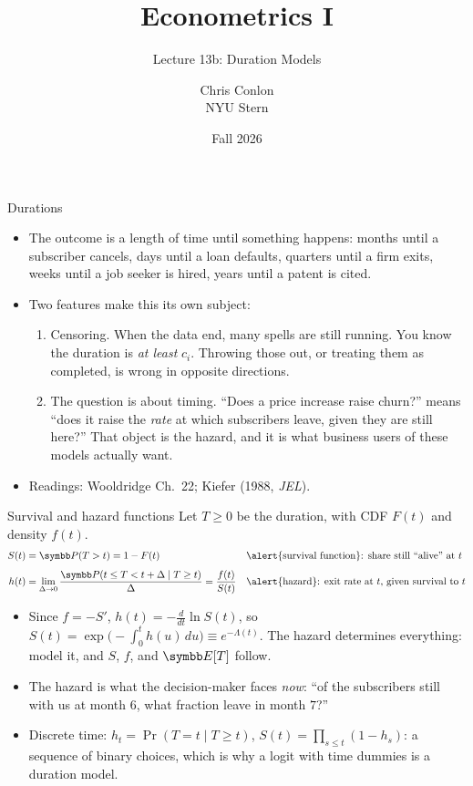 \documentclass[aspectratio=169,11pt]{beamer}
\title[L13b - Duration Models]{ Econometrics I}
\subtitle{Lecture 13b: Duration Models}
\author{Chris Conlon \\NYU Stern}
\date{Fall 2026}
\begin{document}
\maketitle

\begin{frame}{Durations}
\begin{itemize}
	\item The outcome is a \alert{length of time until something happens}: months until a subscriber
	cancels, days until a loan defaults, quarters until a firm exits, weeks until a job seeker is hired,
	years until a patent is cited.
	\medskip
	\item Two features make this its own subject:
	\begin{enumerate}
		\item \alert{Censoring.} When the data end, many spells are still running. You know the
		duration is \emph{at least} $c_i$. Throwing those out, or treating them as completed, is wrong
		in opposite directions.
		\item \alert{The question is about timing.} ``Does a price increase raise churn?'' means
		``does it raise the \emph{rate} at which subscribers leave, given they are still here?'' That
		object is the hazard, and it is what business users of these models actually want.
	\end{enumerate}
	\medskip
	\item Readings: Wooldridge Ch.~22; Kiefer (1988, \emph{JEL}).
\end{itemize}
\end{frame}


\begin{frame}{Survival and hazard functions}
Let $T \ge 0$ be the duration, with CDF $F(t)$ and density $f(t)$.
\begin{align*}
	S(t) &= \Pr(T > t) = 1 - F(t) && \text{\alert{survival function}: share still ``alive'' at } t \\[4pt]
	h(t) &= \lim_{\Delta \to 0} \frac{\Pr(t \le T < t + \Delta \mid T \ge t)}{\Delta} = \frac{f(t)}{S(t)}
	&& \text{\alert{hazard}: exit rate at } t \text{, given survival to } t
\end{align*}
\begin{itemize}
	\item Since $f = -S'$, $h(t) = -\frac{d}{dt}\ln S(t)$, so $S(t) = \exp\big(-\int_0^t h(u)\,du\big) \equiv e^{-\Lambda(t)}$.
	The hazard determines everything: model it, and $S$, $f$, and $\E[T]$ follow.
	\item The hazard is what the decision-maker faces \emph{now}: ``of the subscribers still with us at
	month $6$, what fraction leave in month $7$?''
	\item Discrete time: $h_t = \Pr(T = t \mid T \ge t)$, $S(t) = \prod_{s \le t}(1 - h_s)$: a sequence
	of binary choices, which is why a logit with time dummies is a duration model.
\end{itemize}
\end{frame}
\end{document}
